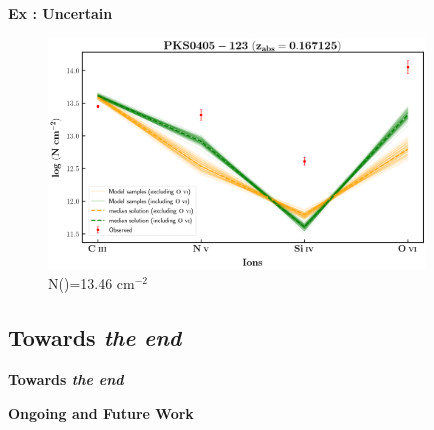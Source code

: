 \documentclass[aspectratio=169]{beamer}
\newcommand\ion[2]{\text{#1\,\textsc{\lowercase{#2}}}}
\begin{document}
\begin{frame}[noframenumbering]{\textbf{Ex : Uncertain}}

  \begin{figure}[!htbp]
    \centering
    \includegraphics[width=10cm]{Figures/pks0405-z=0.167125-compII.png}
    \vspace*{-1mm}
    \caption{N(\ion{H}{i})=13.46 cm$^{-2}$}
  \end{figure}  
  
  \end{frame}



\begin{frame}{}

\section{Towards \textit{the end}}

\vspace*{1cm}

{\huge{\textbf{Towards \textit{the end}}}}

\end{frame}


\begin{frame}{\huge{{\textbf{Ongoing and Future Work}}}}

  
\end{frame}
\end{document}
